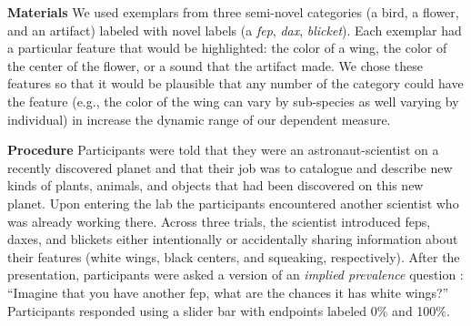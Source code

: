 \documentclass[10pt,letterpaper]{article}
\begin{document}
\noindent\textbf{Materials}
We used exemplars from three semi-novel categories (a bird, a flower, and an artifact) labeled with novel labels (a \emph{fep}, \emph{dax}, \emph{blicket}).
Each exemplar had a particular feature that would be highlighted: the color of a wing, the color of the center of the flower, or a sound that the artifact made. 
We chose these features so that it would be plausible that any number of the category could have the feature (e.g., the color of the wing can vary by sub-species as well varying by individual) in increase the dynamic range of our dependent measure. 

\noindent\textbf{Procedure}
Participants were told that they were an astronaut-scientist on a recently discovered planet and that their job was to catalogue and describe new kinds of plants, animals, and objects that had been discovered on this new planet.  Upon entering the lab the participants encountered another scientist who was already working there. Across three trials, the scientist introduced feps, daxes, and blickets either intentionally or accidentally sharing information about their features (white wings, black centers, and squeaking, respectively). 
After the presentation, participants were asked a version of an \emph{implied prevalence} question \cite{Gelman2002, Cimpian2010a}: ``Imagine that you have another fep, what are the chances it has white wings?'' Participants responded using a slider bar with endpoints labeled 0\% and 100\%.
\end{document}

